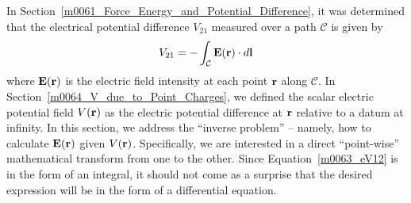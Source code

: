 

\label{m0063_Electric_Field_as_the_Gradient_of_Potential} %

In Section~\ref{m0061_Force_Energy_and_Potential_Difference}, it was determined that the electrical potential difference $V_{21}$ measured over a path ${\mathcal C}$ is given by 
%
\begin{equation}
V_{21} = - \int_{\mathcal C} {\bf E}({\bf r}) \cdot d{\bf l}
\label{m0063_eV12}
\end{equation}
%
where ${\bf E}({\bf r})$ is the electric field intensity at each point ${\bf r}$ along ${\mathcal C}$.
In Section~\ref{m0064_V_due_to_Point_Charges}, we defined the scalar electric potential field $V({\bf r})$ as the electric potential difference at ${\bf r}$ relative to a datum at infinity.
In this section, we address the ``inverse problem'' -- namely, how to calculate ${\bf E}({\bf r})$ given $V({\bf r})$.
Specifically, we are interested in a direct ``point-wise'' mathematical transform from one to the other.
Since Equation~\ref{m0063_eV12} is in the form of an integral, it should not come as a surprise that the desired expression will be in the form of a differential equation.

